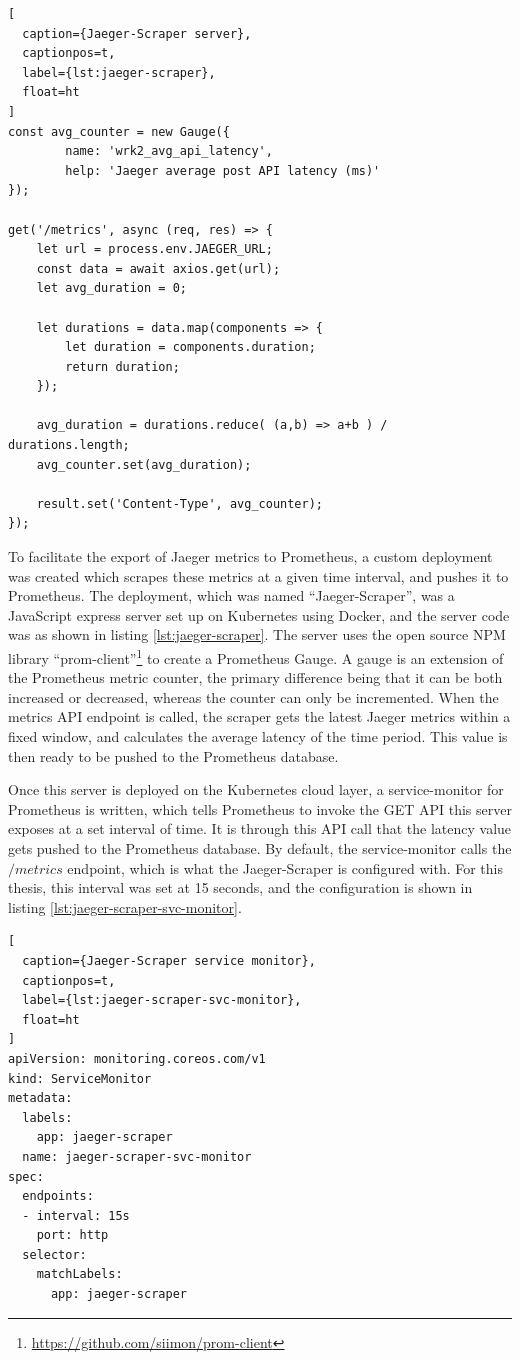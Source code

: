 \begin{lstlisting}[
  caption={Jaeger-Scraper server},
  captionpos=t,
  label={lst:jaeger-scraper},
  float=ht
]
const avg_counter = new Gauge({
        name: 'wrk2_avg_api_latency',
        help: 'Jaeger average post API latency (ms)'
});

get('/metrics', async (req, res) => {
    let url = process.env.JAEGER_URL;
    const data = await axios.get(url);
    let avg_duration = 0;

    let durations = data.map(components => {
        let duration = components.duration;
        return duration;
    });

    avg_duration = durations.reduce( (a,b) => a+b ) / durations.length;
    avg_counter.set(avg_duration);

    result.set('Content-Type', avg_counter);
});
\end{lstlisting}

To facilitate the export of Jaeger metrics to Prometheus, a custom deployment was created which scrapes these metrics at a given time interval, and pushes it to Prometheus. The deployment, which was named ``Jaeger-Scraper'', was a JavaScript express server set up on Kubernetes using Docker, and the server code was as shown in listing \ref{lst:jaeger-scraper}. The server uses the open source NPM library ``prom-client''\footnote{\url{https://github.com/siimon/prom-client}} to create a Prometheus Gauge. A gauge is an extension of the Prometheus metric counter, the primary difference being that it can be both increased or decreased, whereas the counter can only be incremented. When the metrics API endpoint is called, the scraper gets the latest Jaeger metrics within a fixed window, and calculates the average latency of the time period. This value is then ready to be pushed to the Prometheus database.

Once this server is deployed on the Kubernetes cloud layer, a service-monitor for Prometheus is written, which tells Prometheus to invoke the GET API this server exposes at a set interval of time. It is through this API call that the latency value gets pushed to the Prometheus database. By default, the service-monitor calls the $/metrics$ endpoint, which is what the Jaeger-Scraper is configured with. For this thesis, this interval was set at 15 seconds, and the configuration is shown in listing \ref{lst:jaeger-scraper-svc-monitor}.

\begin{lstlisting}[
  caption={Jaeger-Scraper service monitor},
  captionpos=t,
  label={lst:jaeger-scraper-svc-monitor},
  float=ht
]
apiVersion: monitoring.coreos.com/v1
kind: ServiceMonitor
metadata:
  labels:
    app: jaeger-scraper
  name: jaeger-scraper-svc-monitor
spec:
  endpoints:
  - interval: 15s
    port: http
  selector:
    matchLabels:
      app: jaeger-scraper
\end{lstlisting}

